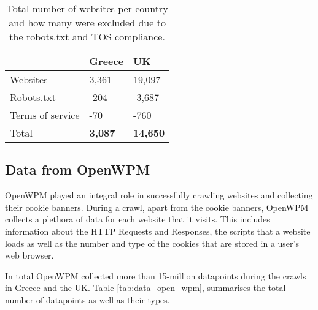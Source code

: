 \documentclass[../main.tex]{subfiles}
\begin{document}
\begin{table}[ht]
    \centering
    \begin{tabular}{@{}lll@{}}
    \toprule
                     & Greece & UK              \\ \midrule
    Websites         & 3,361  & 19,097          \\
    Robots.txt       & -204   & -3,687          \\
    Terms of service & -70    & -760            \\
    Total            & \textbf{3,087}  & \textbf{14,650} \\ \bottomrule
    \end{tabular}
    \caption{Total number of websites per country and how many were excluded due to the robots.txt and TOS compliance.}
    \label{tab:data_websites}
\end{table}

\subsection{Data from OpenWPM}
OpenWPM played an integral role in successfully crawling websites and collecting their cookie banners. During a crawl, apart from the cookie banners, OpenWPM collects a plethora of data for each website that it visits. This includes information about the HTTP Requests and Responses, the scripts that a website loads as well as the number and type of the cookies that are stored in a user’s web browser.

In total OpenWPM collected more than 15-million datapoints during the crawls in Greece and the UK. Table \ref{tab:data_open_wpm}, summarises the total number of datapoints as well as their types. 
\end{document}
